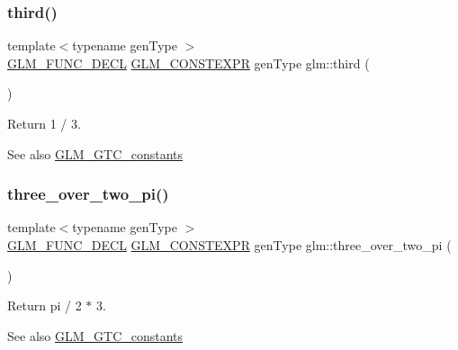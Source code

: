 \subsubsection{\texorpdfstring{third()}{third()}}
{\footnotesize\ttfamily template$<$typename gen\+Type $>$ \\
\hyperlink{setup_8hpp_ab2d052de21a70539923e9bcbf6e83a51}{G\+L\+M\+\_\+\+F\+U\+N\+C\+\_\+\+D\+E\+CL} \hyperlink{setup_8hpp_a08b807947b47031d3a511f03f89645ad}{G\+L\+M\+\_\+\+C\+O\+N\+S\+T\+E\+X\+PR} gen\+Type glm\+::third (\begin{DoxyParamCaption}{ }\end{DoxyParamCaption})}

Return 1 / 3. \begin{DoxySeeAlso}{See also}
\hyperlink{group__gtc__constants}{G\+L\+M\+\_\+\+G\+T\+C\+\_\+constants} 
\end{DoxySeeAlso}
\mbox{\label{group__gtc__constants_gae94950df74b0ce382b1fc1d978ef7394}} 
\subsubsection{\texorpdfstring{three\+\_\+over\+\_\+two\+\_\+pi()}{three\_over\_two\_pi()}}
{\footnotesize\ttfamily template$<$typename gen\+Type $>$ \\
\hyperlink{setup_8hpp_ab2d052de21a70539923e9bcbf6e83a51}{G\+L\+M\+\_\+\+F\+U\+N\+C\+\_\+\+D\+E\+CL} \hyperlink{setup_8hpp_a08b807947b47031d3a511f03f89645ad}{G\+L\+M\+\_\+\+C\+O\+N\+S\+T\+E\+X\+PR} gen\+Type glm\+::three\+\_\+over\+\_\+two\+\_\+pi (\begin{DoxyParamCaption}{ }\end{DoxyParamCaption})}

Return pi / 2 $\ast$ 3. \begin{DoxySeeAlso}{See also}
\hyperlink{group__gtc__constants}{G\+L\+M\+\_\+\+G\+T\+C\+\_\+constants} 
\end{DoxySeeAlso}
\mbox{\label{group__gtc__constants_ga74eadc8a211253079683219a3ea0462a}} 
